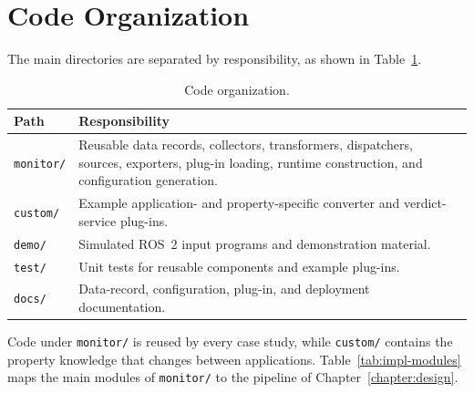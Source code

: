 \section{Code Organization}

The main directories
are separated by responsibility, as shown in
Table~\ref{tab:code-organization}.

\begin{table}[htbp]
\centering
\caption{Code organization.}
\label{tab:code-organization}
\begin{tabular}{p{}p{}}
\toprule
\textbf{Path} & \textbf{Responsibility}\\
\midrule
\texttt{monitor/} & Reusable data records, collectors, transformers,
dispatchers, sources, exporters, plug-in loading, runtime construction, and
configuration generation.\\
\texttt{custom/} & Example application- and property-specific converter and
verdict-service plug-ins.\\
\texttt{demo/} & Simulated ROS~2 input programs and demonstration
material.\\
\texttt{test/} & Unit tests for reusable components and example plug-ins.\\
\texttt{docs/} & Data-record, configuration, plug-in, and deployment
documentation.\\
\bottomrule
\end{tabular}
\end{table}

Code under \texttt{monitor/} is reused by every case study, while
\texttt{custom/} contains the property knowledge that changes between
applications. Table~\ref{tab:impl-modules} maps the main modules of
\texttt{monitor/} to the pipeline of
Chapter~\ref{chapter:design}.

